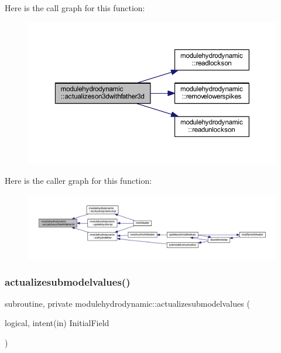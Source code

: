 Here is the call graph for this function\+:\nopagebreak
\begin{figure}[H]
\begin{center}
\leavevmode
\includegraphics[width=350pt]{namespacemodulehydrodynamic_af75db98fe37a03b0a927c6e2799e2b13_cgraph}
\end{center}
\end{figure}
Here is the caller graph for this function\+:\nopagebreak
\begin{figure}[H]
\begin{center}
\leavevmode
\includegraphics[width=350pt]{namespacemodulehydrodynamic_af75db98fe37a03b0a927c6e2799e2b13_icgraph}
\end{center}
\end{figure}
\mbox{\label{namespacemodulehydrodynamic_a6c99419ab0bd5db0c25f899c10d86020}} 
\subsubsection{\texorpdfstring{actualizesubmodelvalues()}{actualizesubmodelvalues()}}
{\footnotesize\ttfamily subroutine, private modulehydrodynamic\+::actualizesubmodelvalues (\begin{DoxyParamCaption}\item[{logical, intent(in)}]{Initial\+Field }\end{DoxyParamCaption})\hspace{0.3cm}{\ttfamily [private]}}

